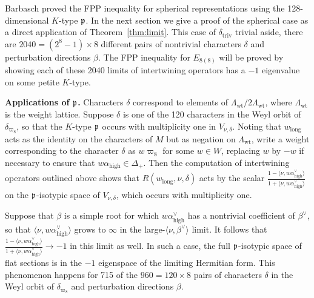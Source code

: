 \documentclass[12pt]{article}
\newcommand{\thmref}[1]{Theorem~\ref{#1}}
\numberwithin{equation}{section}
\renewcommand\a{\alpha}
\renewcommand\b{\beta}
\renewcommand\d{\delta}
\newcommand\D{\Delta}
\renewcommand\D{\Delta}
\renewcommand\({\left(}
\renewcommand\){\right)}
\begin{document}
Barbasch proved the FPP inequality for spherical representations using the 128-dimensional $K$-type $\frak p$.  In the next section we give a proof of the spherical case as a direct application of \thmref{thm:limit}.
This  case of $\delta_{\text{triv}}$ trivial aside, there are $2040=(2^8-1)\times 8$ different pairs of nontrivial characters $\delta$ and perturbation directions $\beta$.  The FPP inequality for $E_{8(8)}$ will be proved by showing each of these 2040 limits of intertwining operators has a $-1$ eigenvalue on some petite $K$-type.




\vspace{.2cm}

{\bf Applications of $\frak p$.} Characters $\delta$ correspond to elements of $\Lambda_{\text{wt}}/2\Lambda_{\text{wt}}$, where $\Lambda_{\text{wt}}$ is the weight lattice. Suppose $\delta$ is one of the 120 characters in the Weyl orbit of $\d_{\varpi_8}$, so that the $K$-type $\frak p$ occurs with multiplicity one in $V_{\nu,\d}$.  Noting that $w_{\text{long}}$ acts as the identity on the characters of $M$ but as negation on  $\Lambda_{\text{wt}}$, write a weight corresponding to the character $\delta$ as $w\varpi_8$ for some $w\in W$,  replacing $w$ by $-w$ if necessary to ensure that $w\a_\text{high}\in \D_+$.  Then the computation of intertwining operators outlined above shows that  $R(w_\text{long},\nu,\delta)$ acts by the scalar $\frac{1-\langle \nu,w\a_\text{high}^\vee\rangle}{1+\langle \nu,w\a_\text{high}^\vee\rangle}$ on the $\frak p$-isotypic space of $V_{\nu,\delta}$, which occurs with multiplicity one.


Suppose that $\beta$ is a simple root for which $w\a_\text{high}^\vee$ has a nontrivial coefficient of $\beta^\vee$, so that  $\langle \nu,w\a_\text{high}^\vee\rangle$ grows to $\infty$ in the large-$\langle \nu,\beta^\vee\rangle$ limit.  It follows that $\frac{1-\langle \nu,w\a_\text{high}^\vee\rangle}{1+\langle \nu,w\a_\text{high}^\vee\rangle}\rightarrow -1$ in this limit as well.  In such a case, the full $\frak p$-isotypic space of flat sections is in the $-1$ eigenspace of the limiting Hermitian form.  This phenomenon happens for 715 of the $960=120\times8$ pairs of characters $\d$ in the Weyl orbit of $\d_{\varpi_8}$ and perturbation directions $\b$.
\end{document}
